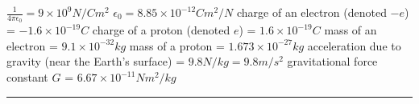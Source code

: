 \documentclass[10pt,landscape]{article}
\begin{document}
\begin{multicols}{3}
$\frac{1}{4\pi\epsilon_0} = 9\times 10^9 N/Cm^2$ \newline
$\epsilon_0 = 8.85\times 10^{-12} {Cm^2/N}$ \newline
charge of an electron (denoted $-e$) = $-1.6\times 10^{-19} C$\newline
charge of a proton (denoted $e$) = $1.6\times 10^{-19} C$\newline
mass of an electron = $9.1\times 10^{-32} kg$ \newline
mass of a proton = $1.673\times 10^{-27} kg$ \newline
acceleration due to gravity (near the Earth's surface) = $9.8 N/kg = 9.8 m/s^2$ \newline
gravitational force constant $G$ = $6.67\times 10^{-11} Nm^2/kg$

\rule{0.3\linewidth}{0.25pt}
\scriptsize


\end{multicols}
\end{document}

